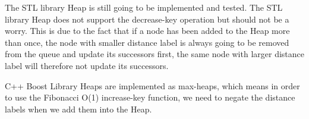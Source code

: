 The STL library Heap is still going to be implemented and tested.
The STL library Heap does not support the decrease-key operation but
should not be a worry.
This is due to the fact that if a node has been added to the Heap more than once,
the node with smaller distance label is always going to be removed from the queue and update its successors first,
the same node with larger distance label will therefore not update its successors.


C++ Boost Library Heaps are implemented as max-heaps,
which means in order to use the Fibonacci O(1) increase-key function,
we need to negate the distance labels when we add them into the Heap.



